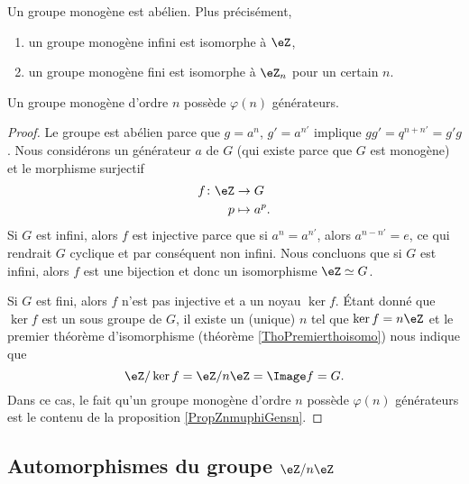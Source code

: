 \begin{theorem}
    Un groupe monogène est abélien. Plus précisément,
    \begin{enumerate}
        \item
            un groupe monogène infini est isomorphe à \( \eZ\),
        \item
            un groupe monogène fini est isomorphe à \( \eZ_n\) pour un certain \( n\).
    \end{enumerate}
    Un groupe monogène d'ordre \( n\) possède \( \varphi(n)\) générateurs.
\end{theorem}

\begin{proof}
    Le groupe est abélien parce que $g=a^n$, \( g'=a^{n'}\) implique \( gg'=q^{n+n'}=g'g\). Nous considérons un générateur \( a\) de \( G\) (qui existe parce que $G$ est monogène) et le morphisme surjectif
    \begin{equation}
        \begin{aligned}
            f\colon \eZ&\to G \\
            p&\mapsto a^p. 
        \end{aligned}
    \end{equation}
    Si \( G\) est infini, alors \( f\) est injective parce que si \( a^n=a^{n'}\), alors \( a^{n-n'}=e\), ce qui rendrait \( G\) cyclique et par conséquent non infini. Nous concluons que si \( G\) est infini, alors \( f\) est une bijection et donc un isomorphisme \( \eZ\simeq G\).

    Si \( G\) est fini, alors \( f\) n'est pas injective et a un noyau \( \ker f\). Étant donné que \( \ker f\) est un sous groupe de \( G\), il existe un (unique) \( n\) tel que \( \ker f=n\eZ\) et le premier théorème d'isomorphisme (théorème \ref{ThoPremierthoisomo}) nous indique que
    \begin{equation}
        \eZ/\ker f=\eZ/n\eZ=\Image f=G.
    \end{equation}
    Dans ce cas, le fait qu'un groupe monogène d'ordre \( n\) possède \( \varphi(n)\) générateurs est le contenu de la proposition \ref{PropZnmuphiGensn}.
\end{proof}

\subsection{Automorphismes du groupe $\eZ/n\eZ$}

